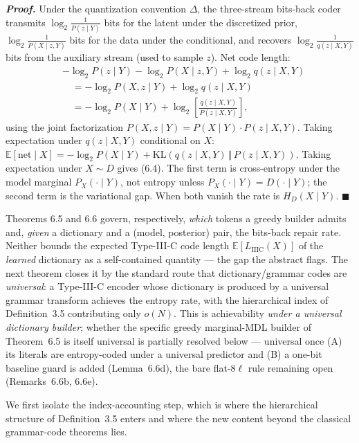 \documentclass[
]{article}
\begin{document}
\emph{\textbf{Proof.}} Under the quantization convention $\Delta$,
the three-stream bits-back coder transmits
$\log_2 \tfrac{1}{P(z \mid Y)}$ bits for the latent under the
discretized prior, $\log_2 \tfrac{1}{P(X \mid z, Y)}$ bits for the
data under the conditional, and recovers
$\log_2 \tfrac{1}{q(z \mid X, Y)}$ bits from the auxiliary stream
(used to sample $z$). Net code length:
\[
\begin{aligned}
&-\log_2 P(z \mid Y) - \log_2 P(X \mid z, Y) + \log_2 q(z \mid X, Y) \\
&\quad= -\log_2 P(X, z \mid Y) + \log_2 q(z \mid X, Y) \\
&\quad= -\log_2 P(X \mid Y) + \log_2 \!\left[\frac{q(z \mid X, Y)}{P(z \mid X, Y)}\right],
\end{aligned}
\]
using the joint factorization
$P(X, z \mid Y) = P(X \mid Y) \cdot P(z \mid X, Y)$. Taking
expectation under $q(z \mid X, Y)$ conditional on $X$:
$\mathbb{E}[\text{net} \mid X] = -\log_2 P(X \mid Y) + \mathrm{KL}(q(z \mid X, Y) \,\Vert\, P(z \mid X, Y))$.
Taking expectation under $X \sim D$ gives (6.4). The first term is
cross-entropy under the model marginal $P_X(\cdot \mid Y)$, not
entropy unless $P_X(\cdot \mid Y) = D(\cdot \mid Y)$; the second
term is the variational gap. When both vanish the rate is
$H_D(X \mid Y)$. \hfill$\blacksquare$

Theorems 6.5 and 6.6 govern, respectively, \emph{which} tokens a
greedy builder admits and, \emph{given} a dictionary and a (model,
posterior) pair, the bits-back repair rate. Neither bounds the
expected Type-III-C code length $\mathbb{E}[L_{\mathrm{IIIC}}(X)]$ of
the \emph{learned} dictionary as a self-contained quantity --- the gap
the abstract flags. The next theorem closes it by the standard route
that dictionary/grammar codes are \emph{universal}: a Type-III-C
encoder whose dictionary is produced by a universal grammar transform
achieves the entropy rate, with the hierarchical index of
Definition~3.5 contributing only $o(N)$. This is achievability
\emph{under a universal dictionary builder}; whether the specific
greedy marginal-MDL builder of Theorem~6.5 is itself universal is
partially resolved below --- universal once (A) its literals are
entropy-coded under a universal predictor and (B) a one-bit baseline
guard is added (Lemma~6.6d), the bare flat-$8\ell$ rule remaining open
(Remarks~6.6b, 6.6e).

We first isolate the index-accounting step, which is where the
hierarchical structure of Definition~3.5 enters and where the new
content beyond the classical grammar-code theorems lies.
\end{document}
